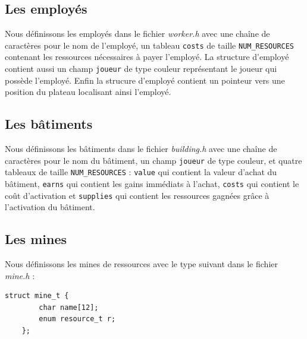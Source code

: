 \documentclass[a4paper,12pt]{report}
\begin{document}
\subsection{Les employés}
Nous définissons les employés dans le fichier \textit{worker.h} avec une chaîne de caractères pour le nom de l'employé, un tableau \texttt{costs} de taille \texttt{NUM\_RESOURCES} contenant les ressources nécessaires à payer l'employé. La structure d'employé contient aussi un champ \texttt{joueur} de type couleur représentant le joueur qui possède l'employé. Enfin la strucure d'employé contient un pointeur vers une position du plateau localisant ainsi l'employé.
\subsection{Les bâtiments}
Nous définissons les bâtiments dans le fichier \textit{building.h} avec une chaîne de caractères pour le nom du bâtiment, un champ \texttt{joueur} de type couleur, et quatre tableaux de taille \texttt{NUM\_RESOURCES} : \texttt{value} qui contient la valeur d'achat du bâtiment, \texttt{earns} qui contient les gains immédiats à l'achat, \texttt{costs} qui contient le coût d'activation et \texttt{supplies} qui contient les ressources gagnées grâce à l'activation du bâtiment. 
\subsection{Les mines}
Nous définissons les mines de ressources avec le type suivant dans le fichier \textit{mine.h} :
\begin{lstlisting}[caption={Structure mine}, label={code:mine}]
    struct mine_t {
        char name[12];
        enum resource_t r;
    };
\end{lstlisting}
\end{document}
